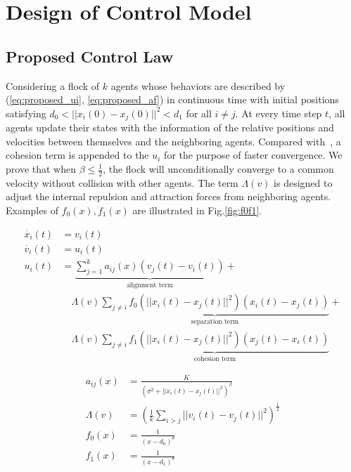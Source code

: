 \chapter{Design of Control Model}\label{design}

\section{Proposed Control Law}\label{control_law}

Considering a flock of $k$ agents whose behaviors are described by (\ref{eq:proposed_ui}, \ref{eq:proposed_af}) in continuous time with initial positions satisfying $d_0<||x_i(0)-x_j(0)||^2<d_1$ for all $i\neq j$. At every time step $t$, all agents update their states with the information of the relative positions and velocities between themselves and the neighboring agents. Compared with~\cite{CuckerDong2010}, a cohesion term is appended to the $u_i$ for the purpose of faster convergence. We prove that when $\beta\leq\frac{1}{2}$, the flock will unconditionally converge to a common velocity without collision with other agents. The term $\Lambda(v)$ is designed to adjust the internal repulsion and attraction forces from neighboring agents. Examples of $f_0(x), f_1(x)$ are illustrated in Fig.\ref{fig:f0f1}.

\begin{equation}\label{eq:proposed_ui}
\begin{aligned}
\dot{x_i}(t)&=v_i(t)\\
\dot{v_i}(t)&=u_i(t)\\
u_i(t)&=\underbrace{\sum^k_{j=1}a_{ij}(x)(v_j(t)-v_i(t))}_{\text{alignment term}}+\\
&\quad\Lambda(v)\underbrace{\sum_{j\neq i}f_0(||x_i(t)-x_j(t)||^2)(x_i(t)-x_j(t))}_{\text{separation term}}+\\
&\quad\Lambda(v)\underbrace{\sum_{j\neq i}f_1(||x_i(t)-x_j(t)||^2)(x_j(t)-x_i(t))}_{\text{cohesion term}}
\end{aligned}
\end{equation}

\begin{equation}\label{eq:proposed_af}
\begin{aligned}
a_{ij}(x)&=\frac{K}{(\sigma^2+||x_i(t)-x_j(t)||^2)^{\beta}}\\
\Lambda(v)&=(\frac{1}{k}\sum_{i>j}||v_i(t)-v_j(t)||^2)^{\frac{1}{2}}\\
f_0(x)&=\frac{1}{(x-d_0)^{\theta}}\\
f_1(x)&=\frac{1}{(x-d_1)^{\theta}}
\end{aligned}
\end{equation}

